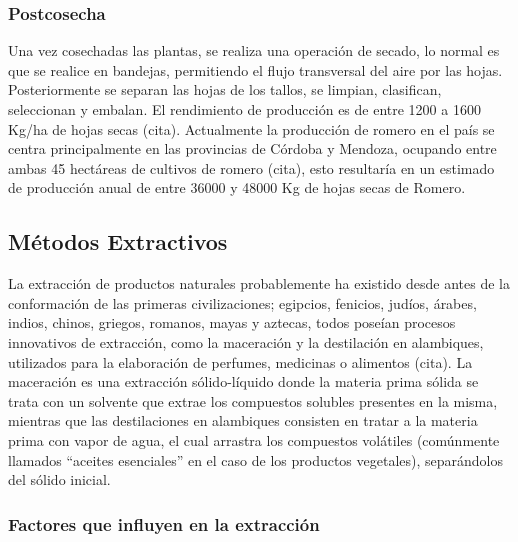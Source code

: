 \documentclass[11pt,a4paper]{article}
\begin{document}
\subsubsection{Postcosecha}

Una vez cosechadas las plantas, se realiza una operación de secado, lo normal es que se realice en bandejas, permitiendo el flujo transversal del aire por las hojas. Posteriormente se separan las hojas de los tallos, se limpian, clasifican, seleccionan y embalan. El rendimiento de producción es de entre 1200 a 1600 Kg/ha de hojas secas (cita).
Actualmente la producción de romero en el país se centra principalmente en las provincias de Córdoba y Mendoza, ocupando entre ambas 45 hectáreas de cultivos de romero (cita), esto resultaría en un estimado de producción anual de entre 36000 y 48000 Kg de hojas secas de Romero.

\subsection{Métodos Extractivos}

La extracción de productos naturales probablemente ha existido desde antes de la conformación de las primeras civilizaciones; egipcios, fenicios, judíos, árabes, indios, chinos, griegos, romanos, mayas y aztecas, todos poseían procesos innovativos de extracción, como la maceración y la destilación en alambiques, utilizados para la elaboración de perfumes, medicinas o alimentos (cita).
La maceración es una extracción sólido-líquido donde la materia prima sólida se trata con un solvente que extrae los compuestos solubles presentes en la misma, mientras que las destilaciones en alambiques consisten en tratar a la materia prima con vapor de agua, el cual arrastra los compuestos volátiles (comúnmente llamados ``aceites esenciales'' en el caso de los productos vegetales), separándolos del sólido inicial.


\subsubsection{Factores que influyen en la extracción}
\end{document}
